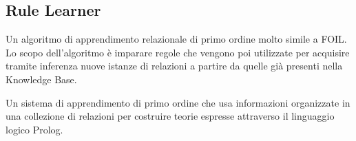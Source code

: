 \subsection{Rule Learner}
Un algoritmo di apprendimento relazionale di primo ordine molto simile a FOIL. Lo scopo dell'algoritmo è imparare regole che vengono poi utilizzate per acquisire tramite inferenza nuove istanze di relazioni a partire da quelle già presenti nella Knowledge Base.
\begin{info}[FOIL]
	Un sistema di apprendimento di primo ordine che usa informazioni organizzate in una collezione di relazioni per costruire teorie espresse attraverso il linguaggio logico Prolog\cite{Inductio61:online}.
\end{info}
\newpage